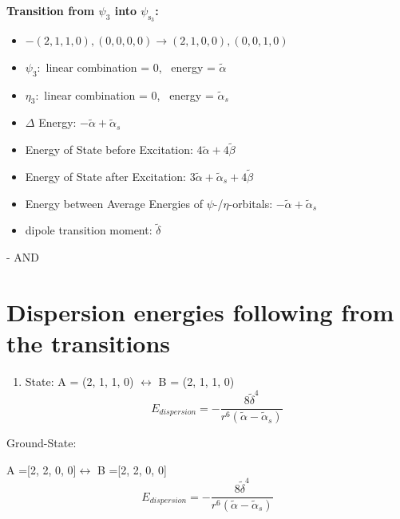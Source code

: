 \documentclass[12pt,a4paper]{article}
\begin{document}
        \noindent\textbf{Transition from $\psi_{3}$ into $\psi_{\text{s}_{3}}$:}
        \begin{itemize}
            \item $- (2, 1, 1, 0), (0, 0, 0, 0) \rightarrow (2, 1, 0, 0), (0, 0, 1, 0)$
        
            \item $\psi_{3}:$ linear combination = $0$, \
            energy = $\tilde{\alpha}$
            
            \item $\eta_{3}:$ linear combination = $0$, \
            energy = $\tilde{\alpha}_{s}$
            
                \item $\Delta$ Energy: $- \tilde{\alpha} + \tilde{\alpha}_{s}$
                \item Energy of State before Excitation: $4 \tilde{\alpha} + 4 \tilde{\beta}$
                \item Energy of State after Excitation: $3 \tilde{\alpha} + \tilde{\alpha}_{s} + 4 \tilde{\beta}$
                \item Energy between Average Energies of $\psi$-/$\eta$-orbitals: $- \tilde{\alpha} + \tilde{\alpha}_{s}$
            
            \item dipole transition moment: $\tilde{\delta}$
        
        \end{itemize}
        
 -  AND 
\newpage \section*{Dispersion energies following from the transitions}

\begin{enumerate}
 \item State: A = (2, 1, 1, 0) $\leftrightarrow$ B = (2, 1, 1, 0) 
$$E_{dispersion} =- \frac{8 \tilde{\delta}^{4}}{r^{6} \left(\tilde{\alpha} - \tilde{\alpha}_{s}\right)}$$
\end{enumerate}
Ground-State:

A =[2, 2, 0, 0]$\leftrightarrow$ B =[2, 2, 0, 0]
$$E_{dispersion} =
- \frac{8 \tilde{\delta}^{4}}{r^{6} \left(\tilde{\alpha} - \tilde{\alpha}_{s}\right)}$$
\end{document}
